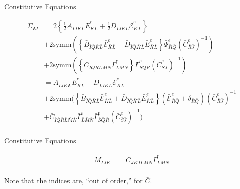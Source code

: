\documentclass[11pt]{beamer}
\begin{document}
\begin{frame}{Constitutive Equations}

\begin{align*}
\bar{\Sigma}_{\bar{I}\bar{J}} &= 2\left\{\frac{1}{2} A_{\bar{I}\bar{J} \bar{K}\bar{L}} \bar{E}_{\bar{K}\bar{L}}^e + \frac{1}{2} \bar{D}_{\bar{I}\bar{J}\bar{K}\bar{L}}\bar{\mathcal{E}}_{\bar{K}\bar{L}}^e\right\}\\
& + 2\text{symm}\left( \left\{ \bar{B}_{\bar{I}\bar{Q}\bar{K}\bar{L}} \bar{\mathcal{E}}_{\bar{K}\bar{L}}^e + \bar{D}_{\bar{I}\bar{Q}\bar{K}\bar{L}}\bar{E}_{\bar{K}\bar{L}}^e  \right\}\bar{\Psi}_{\bar{R}\bar{Q}}^e \left(\bar{C}_{\bar{R}\bar{J}}^e\right)^{-1}\right)\\
& + 2\text{symm}\left(\left\{\bar{C}_{\bar{I}\bar{Q}\bar{R}\bar{L}\bar{M}\bar{N}} \bar{\Gamma}_{\bar{L}\bar{M}\bar{N}}^e\right\} \bar{\Gamma}_{\bar{S}\bar{Q}\bar{R}}^e \left(\bar{C}_{\bar{S}\bar{J}}^e\right)^{-1}\right)\\
&=A_{\bar{I}\bar{J} \bar{K}\bar{L}} \bar{E}_{\bar{K}\bar{L}}^e +\bar{D}_{\bar{I}\bar{J}\bar{K}\bar{L}}\bar{\mathcal{E}}_{\bar{K}\bar{L}}^e\\
& + 2\text{symm}\bigg( \left\{ \bar{B}_{\bar{I}\bar{Q}\bar{K}\bar{L}} \bar{\mathcal{E}}_{\bar{K}\bar{L}}^e + \bar{D}_{\bar{I}\bar{Q}\bar{K}\bar{L}}\bar{E}_{\bar{K}\bar{L}}^e  \right\}\left(\bar{\mathcal{E}}_{\bar{R}\bar{Q}}^e + \delta_{\bar{R}\bar{Q}}\right) \left(\bar{C}_{\bar{R}\bar{J}}^e\right)^{-1}\\
& + \bar{C}_{\bar{I}\bar{Q}\bar{R}\bar{L}\bar{M}\bar{N}} \bar{\Gamma}_{\bar{L}\bar{M}\bar{N}}^e \bar{\Gamma}_{\bar{S}\bar{Q}\bar{R}}^e \left(\bar{C}_{\bar{S}\bar{J}}^e\right)^{-1}\bigg)\\
\end{align*}

\end{frame}

\begin{frame}{Constitutive Equations}

\begin{align*}
\bar{M}_{\bar{I}\bar{J}\bar{K}} &= \bar{C}_{\bar{J}\bar{K}\bar{I}\bar{L}\bar{M}\bar{N}} \bar{\Gamma}_{\bar{L}\bar{M}\bar{N}}^e\\
\end{align*}

Note that the indices are, ``out of order,'' for $\bar{C}$. 

\end{frame}
\end{document}
